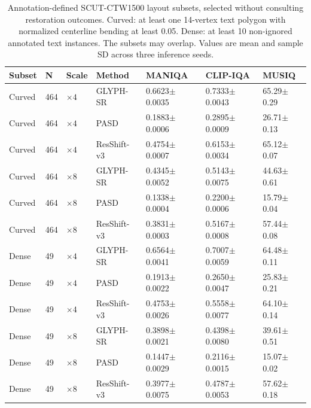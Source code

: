 \begin{table}[H]
\centering
\caption{Annotation-defined SCUT-CTW1500 layout subsets, selected without consulting restoration outcomes. Curved: at least one 14-vertex text polygon with normalized centerline bending at least 0.05. Dense: at least 10 non-ignored annotated text instances. The subsets may overlap. Values are mean and sample SD across three inference seeds.}
\label{tab:ar-layout-iqa}
\small
\setlength{\tabcolsep}{4pt}
\begin{tabular}{lllllll}
\toprule
Subset & N & Scale & Method & MANIQA & CLIP-IQA & MUSIQ \\
\midrule
Curved & 464 & $\times4$ & GLYPH-SR & 0.6623$\pm$0.0035 & 0.7333$\pm$0.0043 & 65.29$\pm$0.29 \\
Curved & 464 & $\times4$ & PASD & 0.1883$\pm$0.0006 & 0.2895$\pm$0.0009 & 26.71$\pm$0.13 \\
Curved & 464 & $\times4$ & ResShift-v3 & 0.4754$\pm$0.0007 & 0.6153$\pm$0.0034 & 65.12$\pm$0.07 \\
Curved & 464 & $\times8$ & GLYPH-SR & 0.4345$\pm$0.0052 & 0.5143$\pm$0.0075 & 44.63$\pm$0.61 \\
Curved & 464 & $\times8$ & PASD & 0.1338$\pm$0.0004 & 0.2200$\pm$0.0006 & 15.79$\pm$0.04 \\
Curved & 464 & $\times8$ & ResShift-v3 & 0.3831$\pm$0.0003 & 0.5167$\pm$0.0008 & 57.44$\pm$0.08 \\
Dense & 49 & $\times4$ & GLYPH-SR & 0.6564$\pm$0.0041 & 0.7007$\pm$0.0059 & 64.48$\pm$0.11 \\
Dense & 49 & $\times4$ & PASD & 0.1913$\pm$0.0022 & 0.2650$\pm$0.0047 & 25.83$\pm$0.21 \\
Dense & 49 & $\times4$ & ResShift-v3 & 0.4753$\pm$0.0026 & 0.5558$\pm$0.0077 & 64.10$\pm$0.14 \\
Dense & 49 & $\times8$ & GLYPH-SR & 0.3898$\pm$0.0021 & 0.4398$\pm$0.0080 & 39.61$\pm$0.51 \\
Dense & 49 & $\times8$ & PASD & 0.1447$\pm$0.0029 & 0.2116$\pm$0.0015 & 15.07$\pm$0.02 \\
Dense & 49 & $\times8$ & ResShift-v3 & 0.3977$\pm$0.0075 & 0.4787$\pm$0.0053 & 57.62$\pm$0.18 \\
\bottomrule
\end{tabular}
\end{table}
